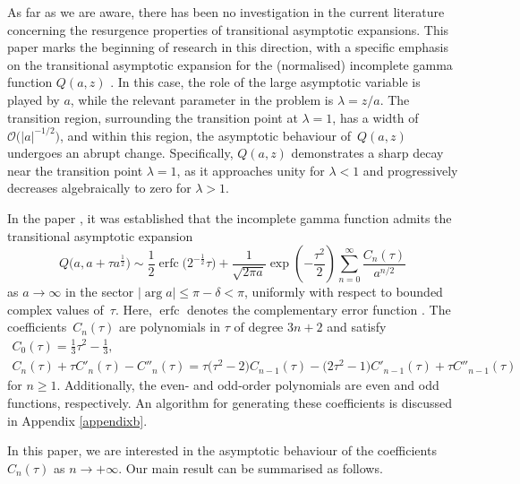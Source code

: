 \documentclass[pdftex]{sigma}
\def\erfc{\operatorname{erfc}}
\numberwithin{equation}{section}
\begin{document}
As far as we are aware, there has been no investigation in the current literature concerning the resurgence properties of transitional asymptotic expansions. This paper marks the beginning of research in this direction, with a specific emphasis on the transitional asymptotic expansion for the (normalised) incomplete gamma function $Q(a, z)$ \cite[Section~8.2\,(i)]{DLMF}. In this case, the role of the large asymptotic variable is played by $a$, while the relevant parameter in the problem is $\lambda=z/a$. The transition region, surrounding the transition point at $\lambda=1$, has a width of~$\mathcal{O}\big(|a|^{-1/2}\big)$, and within this region, the asymptotic behaviour of~$Q(a,z)$ undergoes an abrupt change. Specifically, $Q(a,z)$ demonstrates a sharp decay near the transition point $\lambda=1$, as it approaches unity for $\lambda<1$ and progressively decreases algebraically to zero for $\lambda>1$.

In the paper \cite{Nemes2019}, it was established that the incomplete gamma function admits the transitional asymptotic expansion
\begin{equation}\label{eq2}
Q\big(a,a+\tau a^{\frac{1}{2}}\big) \sim \frac{1}{2} \erfc\big(2^{-\frac{1}{2}}\tau\big) + \frac{1}{\sqrt {2\pi a}}
\exp\left(-\frac{\tau^2}{2}\right) \sum_{n=0}^\infty\frac{C_n(\tau)}{a^{n/2}}
\end{equation}
as $a\to \infty$ in the sector $|\arg a| \le \pi-\delta<\pi$, uniformly with respect to bounded complex values of~$\tau$. Here, $\erfc$ denotes the complementary error function \cite[equation~(2.2)]{DLMF}. The coefficients~$C_n(\tau)$ are polynomials in $\tau$ of degree $3n+2$ and satisfy
\begin{gather}
C_0 (\tau ) = \frac{1}{3}\tau^2-\frac{1}{3},\nonumber\\
C_n (\tau ) + \tau C'_n (\tau ) - C''_n (\tau ) = \tau \big(\tau ^2 - 2\big)C_{n - 1} (\tau ) - \big(2\tau^2 - 1\big)C'_{n - 1} (\tau ) + \tau C''_{n - 1} (\tau )\label{eq32}
\end{gather}
for $n\geq 1$. Additionally, the even- and odd-order polynomials are even and odd functions, respectively. An algorithm for generating these coefficients is discussed in Appendix \ref{appendixb}.

In this paper, we are interested in the asymptotic behaviour of the coefficients $C_n(\tau)$ as $n\to+\infty$. Our main result can be summarised as follows.
\end{document}
